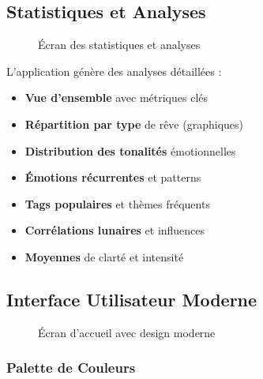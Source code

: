 \documentclass[12pt,a4paper]{article}
\begin{document}
\subsection{Statistiques et Analyses}

\begin{figure}[H]
    \centering
    \caption{Écran des statistiques et analyses}
\end{figure}

L'application génère des analyses détaillées :

\begin{itemize}
    \item \textbf{Vue d'ensemble} avec métriques clés
    \item \textbf{Répartition par type} de rêve (graphiques)
    \item \textbf{Distribution des tonalités} émotionnelles
    \item \textbf{Émotions récurrentes} et patterns
    \item \textbf{Tags populaires} et thèmes fréquents
    \item \textbf{Corrélations lunaires} et influences
    \item \textbf{Moyennes} de clarté et intensité
\end{itemize}

\subsection{Interface Utilisateur Moderne}

\begin{figure}[H]
    \centering
    \caption{Écran d'accueil avec design moderne}
\end{figure}

\subsubsection{Palette de Couleurs}
\end{document}

